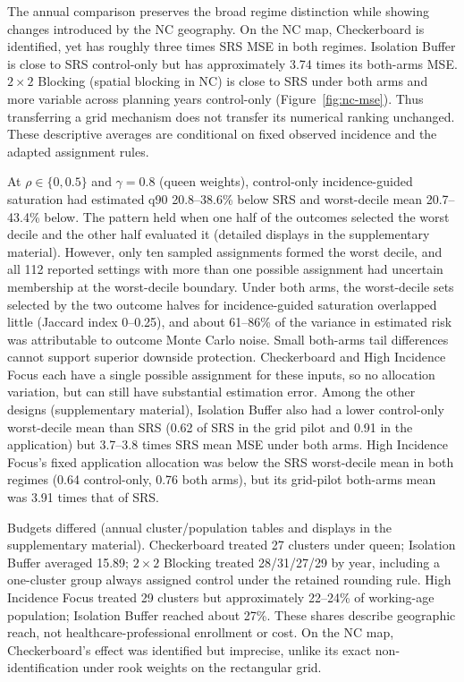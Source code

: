 \documentclass[Afour,sagev,times]{sagej}
\begin{document}
The annual comparison preserves the broad regime distinction while showing changes introduced by the NC geography. On the NC map, Checkerboard is identified, yet has roughly three times SRS MSE in both regimes. Isolation Buffer is close to SRS control-only but has approximately 3.74 times its both-arms MSE. $2\times2$ Blocking (spatial blocking in NC) is close to SRS under both arms and more variable across planning years control-only (Figure~\ref{fig:nc-mse}). Thus transferring a grid mechanism does not transfer its numerical ranking unchanged. These descriptive averages are conditional on fixed observed incidence and the adapted assignment rules.

At $\rho\in\{0,0.5\}$ and $\gamma=0.8$ (queen weights), control-only incidence-guided saturation had estimated q90 20.8--38.6\% below SRS and worst-decile mean 20.7--43.4\% below. The pattern held when one half of the outcomes selected the worst decile and the other half evaluated it (detailed displays in the supplementary material). However, only ten sampled assignments formed the worst decile, and all 112 reported settings with more than one possible assignment had uncertain membership at the worst-decile boundary. Under both arms, the worst-decile sets selected by the two outcome halves for incidence-guided saturation overlapped little (Jaccard index 0--0.25), and about 61--86\% of the variance in estimated risk was attributable to outcome Monte Carlo noise. Small both-arms tail differences cannot support superior downside protection. Checkerboard and High Incidence Focus each have a single possible assignment for these inputs, so no allocation variation, but can still have substantial estimation error. Among the other designs (supplementary material), Isolation Buffer also had a lower control-only worst-decile mean than SRS (0.62 of SRS in the grid pilot and 0.91 in the application) but 3.7--3.8 times SRS mean MSE under both arms. High Incidence Focus's fixed application allocation was below the SRS worst-decile mean in both regimes (0.64 control-only, 0.76 both arms), but its grid-pilot both-arms mean was 3.91 times that of SRS.

Budgets differed (annual cluster/population tables and displays in the supplementary material). Checkerboard treated 27 clusters under queen; Isolation Buffer averaged 15.89; $2\times2$ Blocking treated 28/31/27/29 by year, including a one-cluster group always assigned control under the retained rounding rule. High Incidence Focus treated 29 clusters but approximately 22--24\% of working-age population; Isolation Buffer reached about 27\%. These shares describe geographic reach, not healthcare-professional enrollment or cost. On the NC map, Checkerboard's effect was identified but imprecise, unlike its exact non-identification under rook weights on the rectangular grid.
\end{document}
